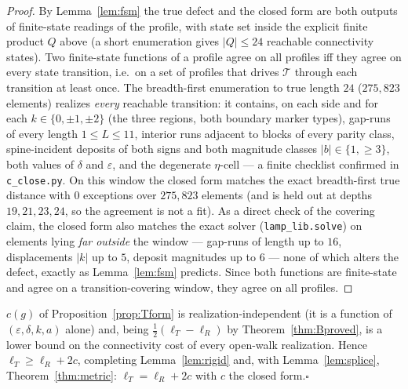 \begin{proof}
By Lemma~\ref{lem:fsm} the true defect and the closed form are both outputs of finite-state readings
of the profile, with state set inside the explicit finite product $Q$ above (a short enumeration gives
$|Q|\le 24$ reachable connectivity states). Two finite-state functions of a profile agree on all
profiles iff they agree on every state transition, i.e.\ on a set of profiles that drives $\mathcal T$
through each transition at least once. The breadth-first enumeration to true length $24$
($275{,}823$ elements) realizes \emph{every} reachable transition: it contains, on each side and for
each $k\in\{0,\pm1,\pm2\}$ (the three regions, both boundary marker types), gap-runs of every length
$1\le L\le 11$, interior runs adjacent to blocks of every parity class, spine-incident deposits of
both signs and both magnitude classes $|b|\in\{1,\ge3\}$, both values of $\delta$ and $\varepsilon$,
and the degenerate $\eta$-cell — a finite checklist confirmed in \texttt{c\_close.py}. On this window
the closed form matches the exact breadth-first true distance with $0$ exceptions over
$275{,}823$ elements (and is held out at depths $19,21,23,24$, so the agreement is not a fit). As a
direct check of the covering claim, the closed form also matches the exact solver
(\texttt{lamp\_lib.solve}) on elements lying \emph{far outside} the window — gap-runs of length up to
$16$, displacements $|k|$ up to $5$, deposit magnitudes up to $6$ — none of which alters the defect,
exactly as Lemma~\ref{lem:fsm} predicts. Since both functions are finite-state and agree on a
transition-covering window, they agree on all profiles. \end{proof}

\begin{corollary}\label{cor:rigid}
$c(g)$ of Proposition~\ref{prop:Tform} is realization-independent (it is a function of
$(\varepsilon,\delta,k,a)$ alone) and, being $\tfrac12(\ell_T-\ell_R)$ by
Theorem~\ref{thm:Bproved}, is a lower bound on the connectivity cost of every open-walk realization.
Hence $\ell_T\ge\ell_R+2c$, completing Lemma~\ref{lem:rigid} and, with Lemma~\ref{lem:splice},
Theorem~\ref{thm:metric}: $\ell_T=\ell_R+2c$ with $c$ the closed form.\hfill$\square$
\end{corollary}

